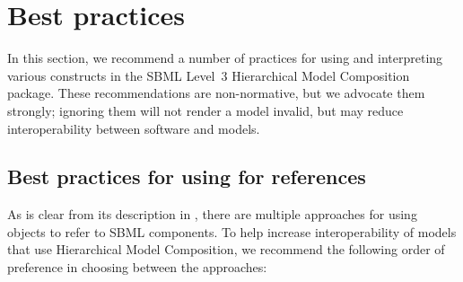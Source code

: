 
\section{Best practices}
\label{best-practices}

In this section, we recommend a number of practices for using and
interpreting various constructs in the SBML Level~3 Hierarchical Model
Composition package.  These recommendations are non-normative, but we
advocate them strongly; ignoring them will not render a model invalid,
but may reduce interoperability between software and models.


\subsection{Best practices for using  for references}
\label{best-practices-sbaseref}

As is clear from its description in , there are multiple
approaches for using \SBaseRef objects to refer to SBML components.  To help
increase interoperability of models that use Hierarchical Model Composition,
we recommend the following order of preference in choosing between the
approaches:

